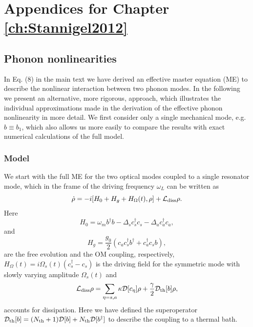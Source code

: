\chapter{Appendices for Chapter \ref{ch:Stannigel2012}}
\label{app:Stannigel2012}


\section{Phonon nonlinearities}

In Eq. (8) in the main text we have derived an effective master equation (ME) to
describe the nonlinear interaction between two phonon modes. In the following we
present an alternative, more rigorous, approach, which illustrates the
individual approximations made in the derivation of the effective phonon
nonlinearity in more detail. We first consider only a single mechanical mode,
e.g. $b\equiv b_1$, which also allows us more easily to compare the results with
exact numerical calculations of the full model.


\subsection{Model}

We start with the full ME for the two optical modes coupled to a single
resonator mode, which in the frame of the driving frequency $\omega_L$ can be
written as
\begin{equation}\label{eq:SM_ME}
\dot \rho = -i[H_0+H_g+ H_\Omega(t),\rho] + \mathcal{L}_{\rm diss} \rho. \\
\end{equation}
Here 
\begin{equation}
H_0=  \omega_m b^\dag b - \Delta_s c_s^\dag c_s - \Delta_a  c_a^\dag c_a, 
\end{equation}
and
\begin{equation}
H_g= \frac{g_0}{2} \left(c_a c_s^\dag b^\dag +    c_a^\dag c_s  b \right),
\end{equation}
are the free evolution and the OM coupling, respectively,  $H_\Omega(t)=
i\Omega_s(t) (c_s^\dag - c_s)$ is the driving field for the symmetric mode with
slowly varying amplitude $\Omega_s(t)$ and
\begin{equation}
\mathcal{L}_{\rm diss} \rho  = \sum_{\eta=s,a} \kappa \mathcal{D}[c_\eta] \rho +
\frac{\gamma}{2} \mathcal{D}_{\rm th}[b]  \rho,
\end{equation}
accounts for dissipation. Here we have defined the superoperator
$\mathcal{D}_{\rm th}[b] = (N_{\rm th}+1)  \mathcal{D}[b] +  N_{\rm th} 
\mathcal{D}[b^\dag]$ to describe the coupling to a thermal bath.



